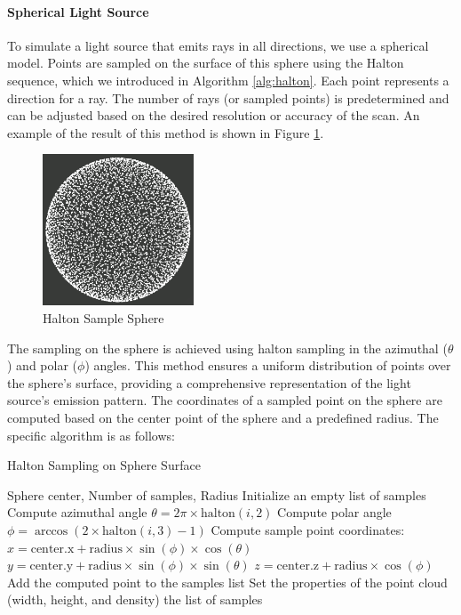 \documentclass[11pt, a4paper,oneside,chapterprefix=false]{scrbook}
\begin{document}
\paragraph{Spherical Light Source}

To simulate a light source that emits rays in all directions, we use a spherical model. Points are sampled on the surface of this sphere using the Halton sequence, which we introduced in Algorithm \ref{alg:halton}. Each point represents a direction for a ray. The number of rays (or sampled points) is predetermined and can be adjusted based on the desired resolution or accuracy of the scan. An example of the result of this method is shown in Figure \ref{fig:halton sample sphere}.

\begin{figure}[H]
    \centering
    \includegraphics*[width=0.4\textwidth]{figures/halton sample sphere.png}
    \caption{Halton Sample Sphere}
    \label{fig:halton sample sphere}
\end{figure}

The sampling on the sphere is achieved using halton sampling in the azimuthal (\( \theta \)) and polar (\( \phi \)) angles. This method ensures a uniform distribution of points over the sphere's surface, providing a comprehensive representation of the light source's emission pattern. The coordinates of a sampled point on the sphere are computed based on the center point of the sphere and a predefined radius. The specific algorithm is as follows:

\begin{algorithm}[H]
\caption{Halton Sampling on Sphere Surface}
\begin{algorithmic}[1]
\Require Sphere center, Number of samples, Radius
\State Initialize an empty list of samples
    \State Compute azimuthal angle \( \theta = 2 \pi \times \text{halton}(i, 2) \)
    \State Compute polar angle \( \phi = \arccos(2 \times \text{halton}(i, 3) - 1) \)
    \State Compute sample point coordinates:
    \State \( x = \text{center.x} + \text{radius} \times \sin(\phi) \times \cos(\theta) \)
    \State \( y = \text{center.y} + \text{radius} \times \sin(\phi) \times \sin(\theta) \)
    \State \( z = \text{center.z} + \text{radius} \times \cos(\phi) \)
    \State Add the computed point to the samples list
\EndFor
\State Set the properties of the point cloud (width, height, and density)
\State \Return the list of samples
\end{algorithmic}
\end{algorithm}
\end{document}
